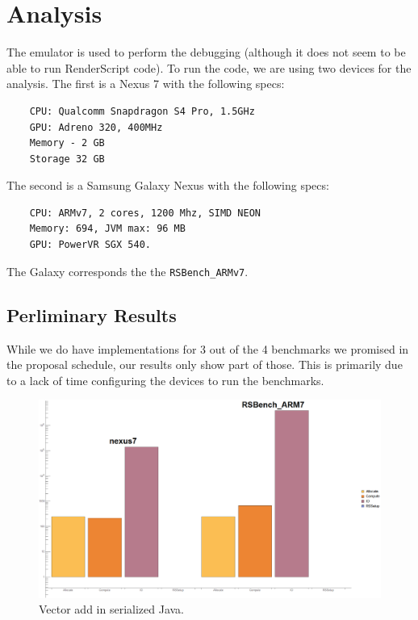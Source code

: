 \section*{Analysis}

The emulator is used to perform the debugging (although it does not seem to be able to run RenderScript code).
To run the code, we are using two devices for the analysis.
The first is a Nexus 7 with the following specs:

\begin{verbatim}
    CPU: Qualcomm Snapdragon S4 Pro, 1.5GHz
    GPU: Adreno 320, 400MHz
    Memory - 2 GB
    Storage 32 GB
\end{verbatim}

The second is a Samsung Galaxy Nexus with the following specs:

\begin{verbatim}
    CPU: ARMv7, 2 cores, 1200 Mhz, SIMD NEON
    Memory: 694, JVM max: 96 MB
    GPU: PowerVR SGX 540.
\end{verbatim}

The Galaxy corresponds the the {\tt RSBench\_ARMv7}.


\subsection*{Perliminary Results}

While we do have implementations for 3 out of the 4 benchmarks we promised in the proposal schedule,
  our results only show part of those.
This is primarily due to a lack of time configuring the devices to run the benchmarks.


\begin{figure}[t!]
\includegraphics[scale=0.13]{VectorAddJava.png}
\caption{Vector add in serialized Java.}
\label{fig:schedule}
\centering
\end{figure}

